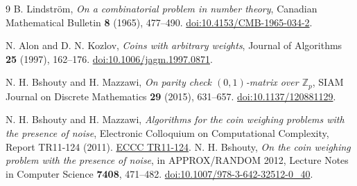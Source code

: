 \documentclass[11pt,letterpaper]{article}
\numberwithin{equation}{section}
\begin{document}
\begingroup\small
\begin{thebibliography}{9}
B. Lindstr\"om, \emph{On a combinatorial problem in number theory}, Canadian Mathematical
Bulletin \textbf{8} (1965), 477--490.
\href{https://doi.org/10.4153/CMB-1965-034-2}{doi:10.4153/CMB-1965-034-2}.

N. Alon and D. N. Kozlov, \emph{Coins with arbitrary weights}, Journal of Algorithms
\textbf{25} (1997), 162--176.
\href{https://doi.org/10.1006/jagm.1997.0871}{doi:10.1006/jagm.1997.0871}.

N. H. Bshouty and H. Mazzawi, \emph{On parity check $(0,1)$-matrix over $\mathbb Z_p$}, SIAM
Journal on Discrete Mathematics \textbf{29} (2015), 631--657.
\href{https://doi.org/10.1137/120881129}{doi:10.1137/120881129}.

N. H. Bshouty and H. Mazzawi, \emph{Algorithms for the coin weighing problems with the
presence of noise}, Electronic Colloquium on Computational Complexity, Report TR11-124 (2011).
\href{https://eccc.weizmann.ac.il/report/2011/124/}{ECCC TR11-124}.
N. H. Bshouty, \emph{On the coin weighing problem with the presence of noise}, in
APPROX/RANDOM 2012, Lecture Notes in Computer Science \textbf{7408}, 471--482.
\href{https://doi.org/10.1007/978-3-642-32512-0_40}{doi:10.1007/978-3-642-32512-0\_40}.
\end{thebibliography}
\endgroup
\end{document}
